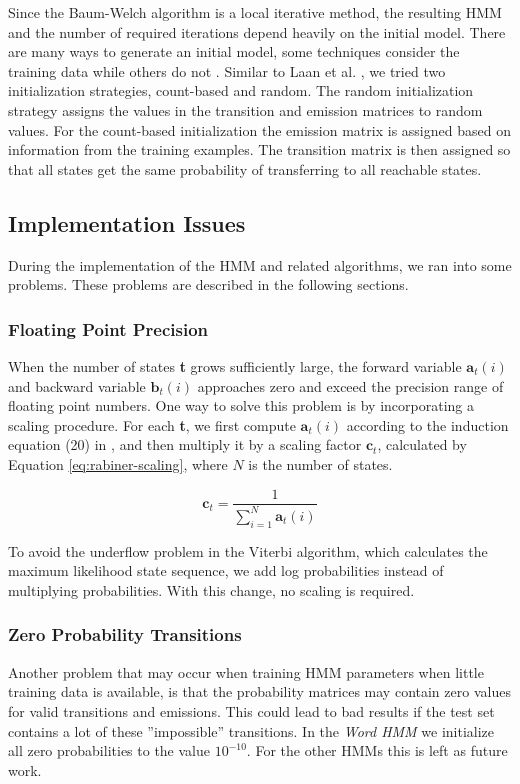 Since the Baum-Welch algorithm is a local iterative method, the resulting HMM and the number of required iterations depend heavily on the initial model. 
There are many ways to generate an initial model, some techniques consider the training data while others do not \cite{Laan}.
Similar to Laan et al. \cite{Laan}, we tried two initialization strategies, count-based and random.
The random initialization strategy assigns the values in the transition and emission matrices to random values.
For the count-based initialization the emission matrix is assigned based on information from the training examples. The transition matrix is then assigned so that all states get the same probability of transferring to all reachable states.

\subsection{Implementation Issues}

During the implementation of the HMM and related algorithms, we ran into some problems. These problems are described in the following sections.

\subsubsection{Floating Point Precision}

When the number of states \textbf{t} grows sufficiently large, the forward variable $\textbf{a}_t(i)$ and backward variable  $\textbf{b}_t(i)$ approaches zero and exceed the precision range of floating point numbers.
One way to solve this problem is by incorporating a scaling procedure.
For each \textbf{t}, we first compute $\textbf{a}_t(i)$ according to the induction equation (20) in  \cite{Rabiner1989}, and then multiply it by a scaling factor  $\textbf{c}_t$, calculated by Equation \ref{eq:rabiner-scaling}, where $N$ is the number of states.

\begin{equation}\label{eq:rabiner-scaling}
\textbf{c}_t = \frac{1}{ \displaystyle\sum_{i=1}^N \textbf{a}_t(i)}
\end{equation}

To avoid the underflow problem in the Viterbi algorithm, which calculates the maximum likelihood state sequence, we add log probabilities instead of multiplying probabilities.
With this change, no scaling is required.

\subsubsection{Zero Probability Transitions}
Another problem that may occur when training HMM parameters when little training data is available, is that the probability matrices may contain zero values for valid transitions and emissions.
This could lead to bad results if the test set contains a lot of these ''impossible'' transitions.
In the \textit{Word HMM} we initialize all zero probabilities to the value \textbf{ $10^{-10}$}.
For the other HMMs this is left as future work.